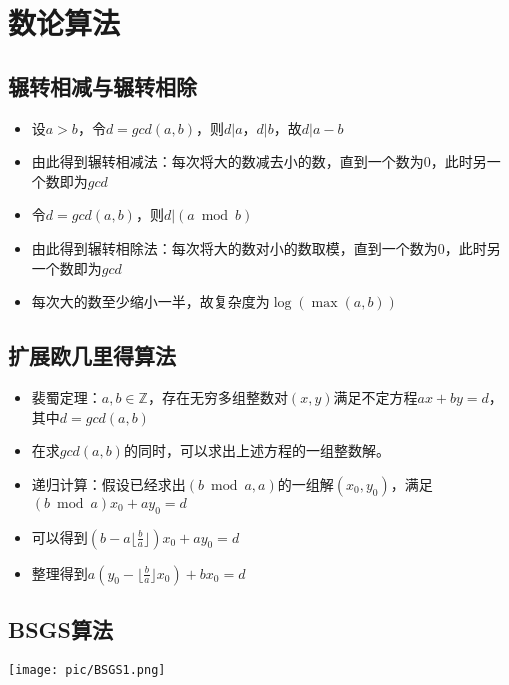 \documentclass{beamer}
\begin{document}
\section{数论算法}

\subsection{辗转相减与辗转相除}
\begin{frame}
\begin{itemize}[<+-| alert@+>]
	\item 设$a>b$，$令d=gcd(a,b)$，则$d|a$，$d|b$，故$d|a-b$
	\item 由此得到辗转相减法：每次将大的数减去小的数，直到一个数为$0$，此时另一个数即为$gcd$
	\item 令$d=gcd(a,b)$，则$d|(a\bmod b)$
	\item 由此得到辗转相除法：每次将大的数对小的数取模，直到一个数为$0$，此时另一个数即为$gcd$
	\item 每次大的数至少缩小一半，故复杂度为$\log(\max(a,b))$
\end{itemize}
\end{frame}

\subsection{扩展欧几里得算法}
\begin{frame}
\begin{itemize}[<+-| alert@+>]
	\item 裴蜀定理：$a,b \in \mathbb{Z}$，存在无穷多组整数对$(x,y)$满足不定方程$ax+by=d$，其中$d=gcd(a,b)$
	\item 在求$gcd(a,b)$的同时，可以求出上述方程的一组整数解。
	\item 递归计算：假设已经求出$(b \bmod a,a)$的一组解$(x_0,y_0)$，满足$(b \bmod a)x_0+ay_0=d$
	\item 可以得到$(b-a\lfloor\frac{b}{a}\rfloor)x_0+ay_0=d$
	\item 整理得到$a(y_0-\lfloor\frac{b}{a}\rfloor x_0)+bx_0=d$
\end{itemize}
\end{frame}

\subsection{BSGS算法}

\begin{frame}
\texttt{[image: pic/BSGS1.png]}
\end{frame}
\end{document}
